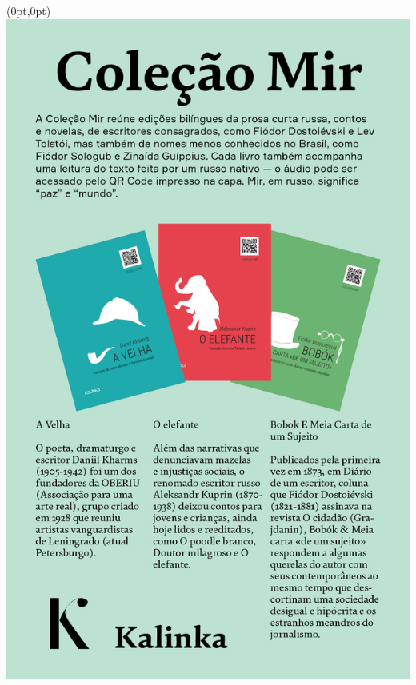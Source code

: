 \pagestyle{kalinka}
\label{kalinka}

\begin{textblock*}{5.625in}(0pt,0pt)%
\vspace*{-3.4cm}
\hspace*{-2.1cm}\includegraphics*[width=160mm]{./imgs/KALINKA.png}
\end{textblock*}

\pagebreak %

